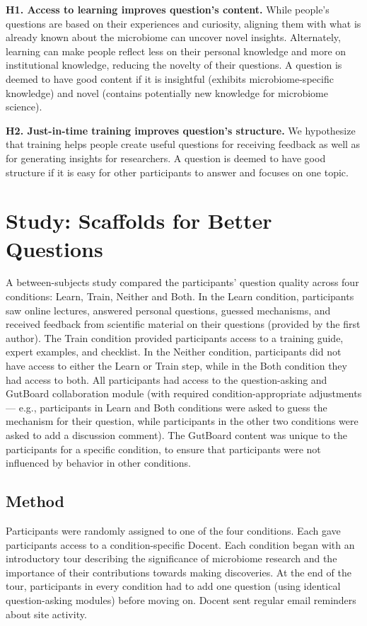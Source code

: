 \textbf{H1. Access to learning improves question’s content.}
While people’s questions are based on their experiences and curiosity, aligning them with what is already known about the microbiome can uncover novel insights. Alternately, learning can make people reflect less on their personal knowledge and more on institutional knowledge, reducing the novelty of their questions. A question is deemed to have good content if it is insightful (exhibits microbiome-specific knowledge) and novel (contains potentially new knowledge for microbiome science).

\textbf{H2. Just-in-time training improves question’s structure.}
We hypothesize that training helps people create useful questions for receiving feedback as well as for generating insights for researchers. A question is deemed to have good structure if it is easy for other participants to answer and focuses on one topic.

\section{Study: Scaffolds for Better Questions}
A between-subjects study compared the participants’ question quality across four conditions: Learn, Train, Neither and Both. In the Learn condition, participants saw online lectures, answered personal questions, guessed mechanisms, and received feedback from scientific material on their questions (provided by the first author). The Train condition provided participants access to a training guide, expert examples, and checklist. In the Neither condition, participants did not have access to either the Learn or Train step, while in the Both condition they had access to both. All participants had access to the question-asking and GutBoard collaboration module (with required condition-appropriate adjustments — e.g., participants in Learn and Both conditions were asked to guess the mechanism for their question, while participants in the other two conditions were asked to add a discussion comment). The GutBoard content was unique to the participants for a specific condition, to ensure that participants were not influenced by behavior in other conditions. 

\subsection*{Method}
Participants were randomly assigned to one of the four conditions. Each gave participants access to a condition-specific Docent. Each condition began with an introductory tour describing the significance of microbiome research and the importance of their contributions towards making discoveries. At the end of the tour, participants in every condition had to add one question (using identical question-asking modules) before moving on. Docent sent regular email reminders about site activity. 


